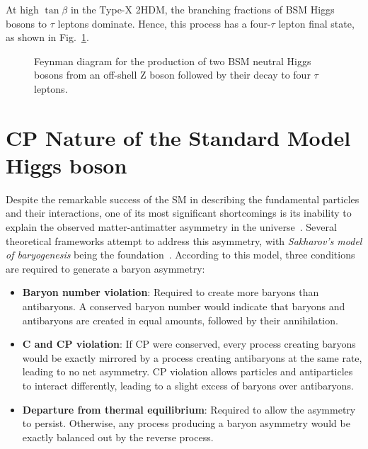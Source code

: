 At high $\tan\beta$ in the Type-X 2HDM, the branching fractions of \ac{BSM} Higgs bosons to $\tau$ leptons dominate. Hence, this process has a four-$\tau$ lepton final state, as shown in Fig.~\ref{Figure:Chapter2_Feynman4tau}. 

\begin{figure}[!htbp]
\centering

\caption[Feynman diagram for the production of two Beyond-the-Standard Model neutral Higgs bosons from an off-shell Z boson followed by their decay to four $\tau$ leptons.]{Feynman diagram for the production of two \ac{BSM} neutral Higgs bosons from an off-shell Z boson followed by their decay to four $\tau$ leptons.}
\label{Figure:Chapter2_Feynman4tau}
\end{figure}

\section{CP Nature of the Standard Model Higgs boson}
\label{Section:Chapter2_CP_Nature}
Despite the remarkable success of the \ac{SM} in describing the fundamental particles and their interactions, one of its most significant shortcomings is its inability to explain the observed matter-antimatter asymmetry in the universe~\cite{MatterAntimatter}. Several theoretical frameworks attempt to address this asymmetry, with \textit{Sakharov's model of baryogenesis} being the foundation~\cite{Sakharov}. According to this model, three conditions are required to generate a baryon asymmetry:

\begin{itemize}
    \item \textbf{Baryon number violation}: Required to create more baryons than antibaryons. A conserved baryon number would indicate that baryons and antibaryons are created in equal amounts, followed by their annihilation.
    \item \textbf{C and CP violation}: If CP were conserved, every process creating baryons would be exactly mirrored by a process creating antibaryons at the same rate, leading to no net asymmetry. CP violation allows particles and antiparticles to interact differently, leading to a slight excess of baryons over antibaryons.
    \item \textbf{Departure from thermal equilibrium}: Required to allow the asymmetry to persist. Otherwise, any process producing a baryon asymmetry would be exactly balanced out by the reverse process.
\end{itemize}

